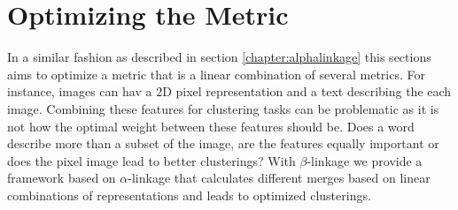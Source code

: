 \chapter{Optimizing the Metric}
\label{sec:beta}

In a similar fashion as described in section \ref{chapter:alphalinkage} this sections aims to optimize a metric that is a linear combination of several metrics. For instance, images can hav a 2D pixel representation and a text describing the each image. Combining these features for clustering tasks can be problematic as it is not how the optimal weight between these features should be. Does a word describe more than a subset of the image, are the features equally important or does the pixel image lead to better clusterings? With $\beta$-linkage we provide a framework based on $\alpha$-linkage that calculates different merges based on linear combinations of representations and leads to optimized clusterings.